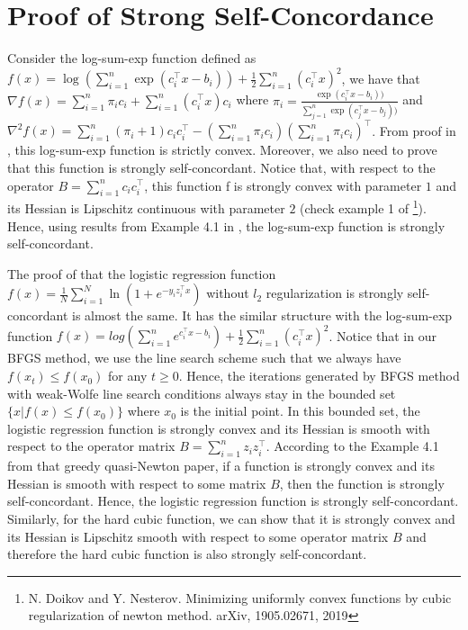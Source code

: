 \documentclass[11pt,letterpaper]{article}
\newcommand\0{{\Vector{0}}}
\newcommand\1{{\Vector{1}}}
\numberwithin{assumption}{section}
\numberwithin{definition}{section}
\numberwithin{theorem}{section}
\numberwithin{remark}{section}
\begin{document}
\section{Proof of Strong Self-Concordance}\label{proof_of_concordance}

Consider the log-sum-exp function defined as $f(x) = \log{(\sum_{i = 1}^{n}\exp({c_i^\top x - b_i}))} + \frac{1}{2}\sum_{i = 1}^{n}(c_i^\top x)^2$, we have that $\nabla{f}(x) = \sum_{i = 1}^{n}\pi_i c_i + \sum_{i = 1}^{n}(c_i^\top x)c_i$ where $\pi_i = \frac{\exp({c_i^\top x - b_i}))}{\sum_{j = 1}^{n}\exp({c_j^\top x - b_j}))}$ and $\nabla^2{f}(x) = \sum_{i = 1}^{n}(\pi_i + 1) c_i c_i^\top - (\sum_{i = 1}^{n}\pi_i c_i)(\sum_{i = 1}^{n}\pi_i c_i)^\top$. From proof in \cite{logsumconvex}, this log-sum-exp function is strictly convex. Moreover, we also need to prove that this function is strongly self-concordant. Notice that, with respect to the operator $B = \sum_{i = 1}^{n}c_i c_i^\top$, this function f is strongly convex with parameter $1$ and its Hessian is Lipschitz continuous with parameter $2$ (check example 1 of \cite{uniformlyconvex}\footnote{N. Doikov and Y. Nesterov. Minimizing uniformly convex functions by cubic regularization of newton method. arXiv, 1905.02671, 2019}). Hence, using results from Example 4.1 in \cite{rodomanov2020greedy}, the log-sum-exp function is strongly self-concordant.

The proof of that the logistic regression function $f(x) = \frac{1}{N}\sum_{i = 1}^{N}\ln{(1 + e^{-y_i z_i^\top x})}$ without $l_2$ regularization is strongly self-concordant is almost the same. It has the similar structure with the log-sum-exp function $f(x) = log{(\sum_{i = 1}^{n}e^{c_i^\top x - b_i})} + \frac{1}{2}\sum_{i = 1}^{n}(c_i^\top x)^2$. Notice that in our BFGS method, we use the line search scheme such that we always have $f(x_t) \leq f(x_0)$ for any $t \geq 0$. Hence, the iterations generated by BFGS method with weak-Wolfe line search conditions always stay in the bounded set $\{x|f(x) \leq f(x_0)\}$ where $x_0$ is the initial point. In this bounded set, the logistic regression function is strongly convex and its Hessian is smooth with respect to the operator matrix $B = \sum_{i = 1}^{n}z_iz_i^\top$. According to the Example 4.1 from that greedy quasi-Newton paper, if a function is strongly convex and its Hessian is smooth with respect to some matrix $B$, then the function is strongly self-concordant. Hence, the logistic regression function is strongly self-concordant. Similarly, for the hard cubic function, we can show that it is strongly convex and its Hessian is Lipschitz smooth with respect to some operator matrix $B$ and therefore the hard cubic function is also strongly self-concordant.
\end{document}
